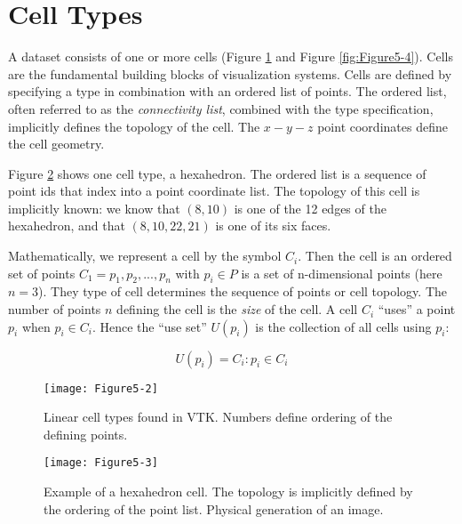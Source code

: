 \section{Cell Types}
\label{sec:cell_types}

A dataset consists of one or more cells (Figure \ref{fig:Figure5-2} and Figure \ref{fig:Figure5-4}). Cells are the fundamental building blocks of visualization systems. Cells are defined by specifying a type in combination with an ordered list of points. The ordered list, often referred to as the \emph{connectivity list}, combined with the type specification, implicitly defines the topology of the cell. The $x-y-z$ point coordinates define the cell geometry.

Figure \ref{fig:Figure5-3} shows one cell type, a hexahedron. The ordered list is a sequence of point ids that index into a point coordinate list. The topology of this cell is implicitly known: we know that $(8,10)$ is one of the 12 edges of the hexahedron, and that $(8,10,22,21)$ is one of its six faces.

Mathematically, we represent a cell by the symbol $C_i$. Then the cell is an ordered set of points $C_1 = {p_1, p_2,..., p_n}$ with $p_i \in P$ is a set of n-dimensional points (here $n=3$). They type of cell determines the sequence of points or cell topology. The number of points $n$ defining the cell is the \emph{size} of the cell. A cell $C_i$ ``uses'' a point $p_i$ when $p_i \in C_i$. Hence the ``use set'' $U(p_i)$ is the collection of all cells using $p_i$:

\begin{equation}\label{eq:5.1}
U(p_i) = {C_i:p_i \in C_i}
\end{equation}

\begin{figure}[!htb]
	\centering
	\texttt{[image: Figure5-2]}
	\caption{Linear cell types found in VTK. Numbers define ordering of the defining points.}
	\label{fig:Figure5-2}
\end{figure}


\begin{figure}[!htb]
	\centering
	\texttt{[image: Figure5-3]}
	\caption{Example of a hexahedron cell. The topology is implicitly defined by the ordering of the point list. Physical generation of an image.}
	\label{fig:Figure5-3}
\end{figure}

